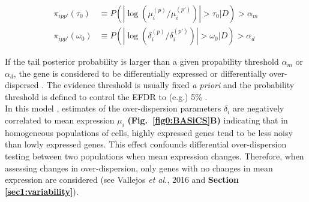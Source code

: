 \begin{align*}
\pi_{ipp'}(\tau_0)&\equiv{}P(|\log(\mu_i^{(p)}/\mu_i^{(p')})|>\tau_0|D)>\alpha_m\\
\pi_{ipp'}(\omega_0)&\equiv{}P(|\log(\delta_i^{(p)}/\delta_i^{(p')})|>\omega_0|D)>\alpha_d
\end{align*}

If the tail posterior probability is larger than a given propability threshold $\alpha_m$ or $\alpha_d$, the gene is considered to be differentially expressed or differentially over-dispersed \citep{Vallejos2016}. The evidence threshold is usually fixed \emph{a priori} and the probability threshold is defined to control the \gls{EFDR} to (e.g.) 5\% \cite{Newton2004, Vallejos2016}.\\

In this model \citep{Vallejos2016}, estimates of the over-dispersion parameters $\delta_i$ are negatively correlated to mean expression $\mu_i$ \textbf{(Fig.~\ref{fig0:BASiCS}B)} indicating that in homogeneous populations of cells, highly expressed genes tend to be less noisy than lowly expressed genes. This effect confounds differential over-dispersion testing between two populations when mean expression changes. Therefore, when assessing changes in over-dispersion, only genes with no changes in mean expression are considered (see Vallejos \emph{et al.}, 2016 \citep{Vallejos2016} and \textbf{Section \ref{sec1:variability}}).  
